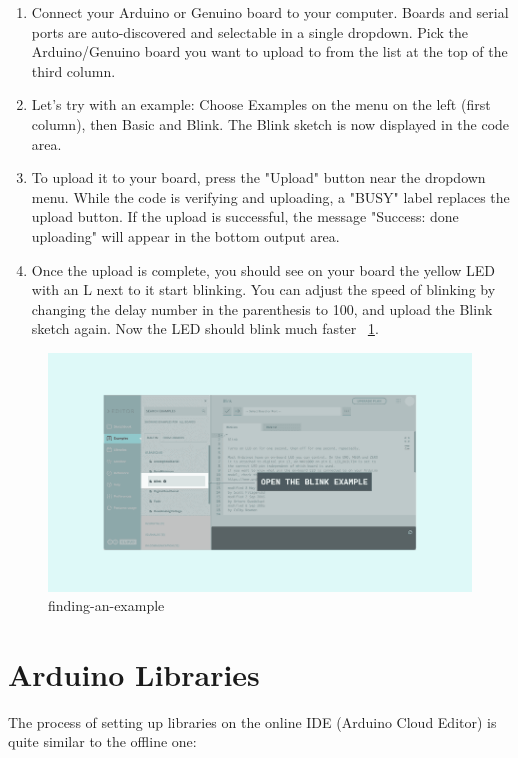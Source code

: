 \begin{enumerate}
	\item Connect your Arduino or Genuino board to your computer. Boards and serial ports are auto-discovered and selectable in a single dropdown. Pick the Arduino/Genuino board you want to upload to from the list at the top of the third column.\cite{arduinoWebEditor:2024}
	\item Let’s try with an example: Choose Examples on the menu on the left (first column), then Basic and Blink. The Blink sketch is now displayed in the code area. 
	\item To upload it to your board, press the "Upload" button near the dropdown menu. While the code is verifying and uploading, a "BUSY" label replaces the upload button. If the upload is successful, the message "Success: done uploading" will appear in the bottom output area.
	\item Once the upload is complete, you should see on your board the yellow LED with an L next to it start blinking. You can adjust the speed of blinking by changing the delay number in the parenthesis to 100, and upload the Blink sketch again. Now the LED should blink much faster ~\ref{finding-an-example}.
\end{enumerate}

\begin{figure}
	\begin{center}
		\includegraphics[width=0.7\linewidth]{Images/Arduino/finding-an-example.png}
		\caption{finding-an-example}
		\label{finding-an-example}
	\end{center}
\end{figure} 

\section{Arduino Libraries}
The process of setting up libraries on the online IDE (Arduino Cloud Editor) is quite similar to the offline one: \cite{arduinoLibraries:2025} \cite{arduinoCloud:2025}

